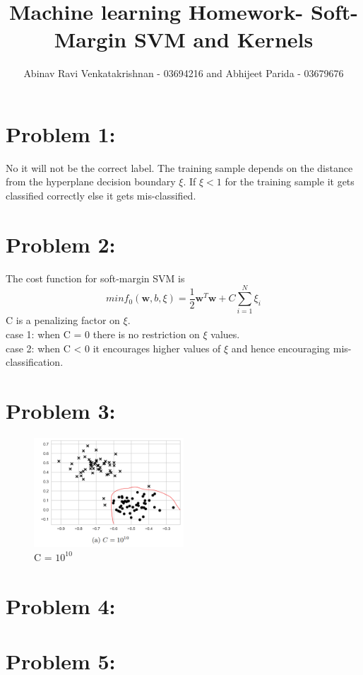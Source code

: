 \documentclass[5pt,a4paper]{article}
\begin{document}
	\title{Machine learning Homework- Soft-Margin SVM and Kernels }
	\author{Abinav Ravi Venkatakrishnan - 03694216 and Abhijeet Parida - 03679676}
	\maketitle
	\section*{Problem 1:}
	No it will not be the correct label. The training sample depends on the distance from the hyperplane decision boundary $\xi$. If $ \xi < 1 $ for the training sample it gets classified correctly else it gets mis-classified.
	
	\section*{Problem 2:}
	The cost function for soft-margin SVM is 
	\begin{equation}
	min f_0(\textbf{w},b,\xi) = \frac{1}{2}\textbf{w}^T \textbf{w}+ C \sum_{i=1}^{N} \xi_i
	\end{equation}
	C is a penalizing factor on $ \xi $. \\
	case 1: when C = 0 there is no restriction on $\xi$ values.\\
	case 2: when C < 0 it encourages higher values of $\xi$ and hence encouraging mis-classification.  
	\section*{Problem 3:}
	\begin{figure}[h]
		\includegraphics[width=0.5\textwidth]{img1_f.png}
		\caption{C = $10^10$}
	\end{figure}
	
	
	\section*{Problem 4:}
	
	\section*{Problem 5:}
	
	
\end{document}
